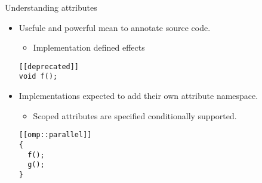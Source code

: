 \begin{frame}[t,fragile]{Understanding attributes}
\begin{itemize}
  \item Usefule and powerful mean to annotate source code.
    \begin{itemize}
      \item Implementation defined effects
    \end{itemize}
\begin{lstlisting}
[[deprecated]]
void f();
\end{lstlisting}

  \vfill\pause
  \item Implementations expected to add their own attribute namespace.
    \begin{itemize}
      \item Scoped attributes are specified conditionally supported.
    \end{itemize}
\begin{lstlisting}
[[omp::parallel]]
{
  f();
  g();
}
\end{lstlisting}
\end{itemize}
\end{frame}
